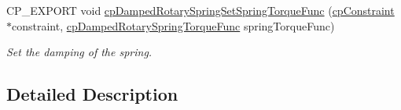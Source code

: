 \begin{DoxyCompactItemize}
C\+P\+\_\+\+E\+X\+P\+O\+RT void \hyperlink{group__cpDampedRotarySpring_ga79b061501fb25d4163a301330e10bb26}{cp\+Damped\+Rotary\+Spring\+Set\+Spring\+Torque\+Func} (\hyperlink{structcpConstraint}{cp\+Constraint} $\ast$constraint, \hyperlink{group__cpDampedRotarySpring_ga072c236959020fab4f30087b5234040b}{cp\+Damped\+Rotary\+Spring\+Torque\+Func} spring\+Torque\+Func)
\begin{DoxyCompactList}\small\item\em Set the damping of the spring. \end{DoxyCompactList}\end{DoxyCompactItemize}


\subsection{Detailed Description}
